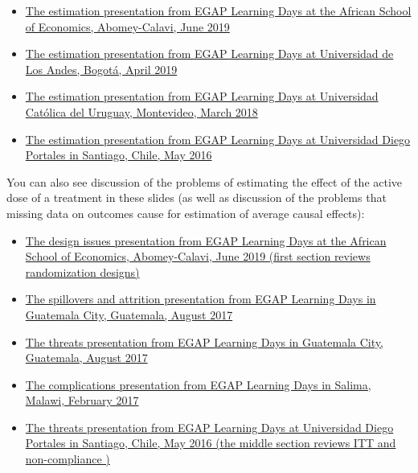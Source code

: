\documentclass[12pt,]{book}
\begin{document}
\begin{itemize}
\item
  \href{https://egap.github.io/learningdays-resources/Slides/Examples/estimation-benin.pdf}{The estimation presentation from EGAP Learning Days at the African School of Economics, Abomey-Calavi, June 2019}
\item
  \href{https://egap.github.io/learningdays-resources/Slides/Examples/estimation-bogota.pdf}{The estimation presentation from EGAP Learning Days at Universidad de Los Andes, Bogotá, April 2019}
\item
  \href{https://egap.github.io/learningdays-resources/Slides/Examples/estimation-montevideo.pdf}{The estimation presentation from EGAP Learning Days at Universidad Católica del Uruguay, Montevideo, March 2018}
\item
  \href{https://egap.github.io/learningdays-resources/Slides/Examples/estimation-santiago.pdf}{The estimation presentation from EGAP Learning Days at Universidad Diego Portales in Santiago, Chile, May 2016}
\end{itemize}

You can also see discussion of the problems of estimating the effect of the active dose of a treatment in these slides (as well as discussion of the problems that missing data on outcomes cause for estimation of average causal effects):

\begin{itemize}
\item
  \href{https://egap.github.io/learningdays-resources/Slides/Examples/threats-benin.pdf}{The design issues presentation from EGAP Learning Days at the African School of Economics, Abomey-Calavi, June 2019 (first section reviews randomization designs)}
\item
  \href{https://egap.github.io/learningdays-resources/Slides/Examples/spillovers_attrition-guatemala.pdf}{The spillovers and attrition presentation from EGAP Learning Days in Guatemala City, Guatemala, August 2017}
\item
  \href{https://egap.github.io/learningdays-resources/Slides/Examples/threats-guatemala.pdf}{The threats presentation from EGAP Learning Days in Guatemala City, Guatemala, August 2017}
\item
  \href{https://egap.github.io/learningdays-resources/Slides/Examples/complications-malawi.pdf}{The complications presentation from EGAP Learning Days in Salima, Malawi, February 2017}
\item
  \href{https://egap.github.io/learningdays-resources/Slides/Examples/threats-santiago.pdf}{The threats presentation from EGAP Learning Days at Universidad Diego Portales in Santiago, Chile, May 2016 (the middle section reviews ITT and non-compliance )}
\end{itemize}
\end{document}

